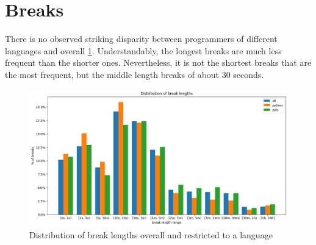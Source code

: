 \section{Breaks}

There is no observed striking disparity between programmers of different languages and overall \ref{fig:breaks}. Understandably, the longest breaks are much less frequent than the shorter ones. Nevertheless, it is not the shortest breaks that are the most frequent, but the middle length breaks of about 30 seconds.

\begin{figure}[htbp]
  \centering
  \includegraphics[scale=0.5]{chapters/results/graphics/breaks.png}
  \caption{Distribution of break lengths overall and restricted to a language}
  \label{fig:breaks}
\end{figure}
